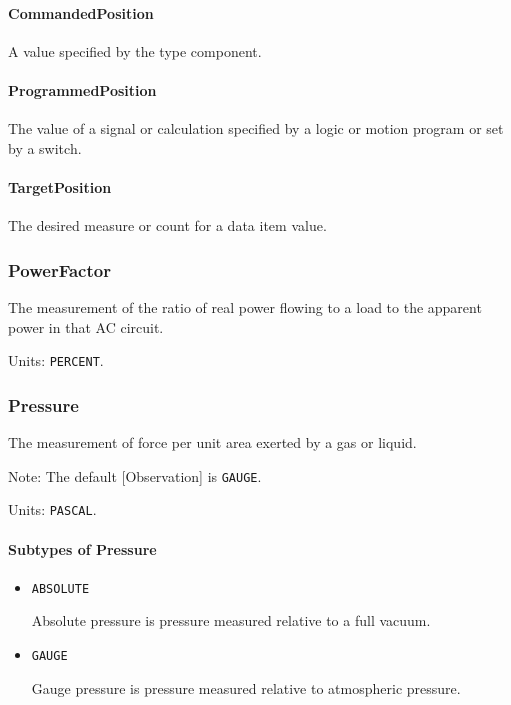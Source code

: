 \paragraph{CommandedPosition}\mbox{}
\label{sec:CommandedPosition}


A value specified by the  type component.


\paragraph{ProgrammedPosition}\mbox{}
\label{sec:ProgrammedPosition}


The value of a signal or calculation specified by a logic or motion program or set by a switch.


\paragraph{TargetPosition}\mbox{}
\label{sec:TargetPosition}


The desired measure or count for a data item value.


\subsubsection{PowerFactor}
\label{sec:PowerFactor}



The measurement of the ratio of real power flowing to a load to the apparent power in that AC circuit.


Units: \texttt{PERCENT}.

\subsubsection{Pressure}




The measurement of force per unit area exerted by a gas or liquid.

Note: The default [Observation] is \texttt{GAUGE}.


Units: \texttt{PASCAL}.

\paragraph{Subtypes of Pressure}\mbox{}
\label{sec:Subtypes of Pressure}

\begin{itemize}

\item \texttt{ABSOLUTE}


Absolute pressure is pressure measured relative to a full vacuum.

\item \texttt{GAUGE}


Gauge pressure is pressure measured relative to atmospheric pressure.


\end{itemize}

